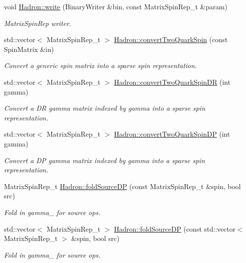\begin{DoxyCompactItemize}
void \mbox{\hyperlink{namespaceHadron_ae38baf2d1cfe9fdaf455f274e722b32f}{Hadron\+::write}} (Binary\+Writer \&bin, const Matrix\+Spin\+Rep\+\_\+t \&param)
\begin{DoxyCompactList}\small\item\em Matrix\+Spin\+Rep writer. \end{DoxyCompactList}\item 
std\+::vector$<$ Matrix\+Spin\+Rep\+\_\+t $>$ \mbox{\hyperlink{namespaceHadron_a6bcb90f42724a0f4ce09eeb64bd54c80}{Hadron\+::convert\+Two\+Quark\+Spin}} (const Spin\+Matrix \&in)
\begin{DoxyCompactList}\small\item\em Convert a generic spin matrix into a sparse spin representation. \end{DoxyCompactList}\item 
std\+::vector$<$ Matrix\+Spin\+Rep\+\_\+t $>$ \mbox{\hyperlink{namespaceHadron_aadefc7d519d40f16cb37c4df644944e7}{Hadron\+::convert\+Two\+Quark\+Spin\+DR}} (int gamma)
\begin{DoxyCompactList}\small\item\em Convert a DR gamma matrix indexed by gamma into a sparse spin representation. \end{DoxyCompactList}\item 
std\+::vector$<$ Matrix\+Spin\+Rep\+\_\+t $>$ \mbox{\hyperlink{namespaceHadron_a9d2555db4b8f920142f7c79e6752eccd}{Hadron\+::convert\+Two\+Quark\+Spin\+DP}} (int gamma)
\begin{DoxyCompactList}\small\item\em Convert a DP gamma matrix indexed by gamma into a sparse spin representation. \end{DoxyCompactList}\item 
Matrix\+Spin\+Rep\+\_\+t \mbox{\hyperlink{namespaceHadron_aa258f26ea52528eac314f32a02bf8ac3}{Hadron\+::fold\+Source\+DP}} (const Matrix\+Spin\+Rep\+\_\+t \&spin, bool src)
\begin{DoxyCompactList}\small\item\em Fold in gamma\+\_ for source ops. \end{DoxyCompactList}\item 
std\+::vector$<$ Matrix\+Spin\+Rep\+\_\+t $>$ \mbox{\hyperlink{namespaceHadron_a26162db6431302c5e52fbd5fafdbedae}{Hadron\+::fold\+Source\+DP}} (const std\+::vector$<$ Matrix\+Spin\+Rep\+\_\+t $>$ \&spin, bool src)
\begin{DoxyCompactList}\small\item\em Fold in gamma\+\_ for source ops. \end{DoxyCompactList}\item 

\end{DoxyCompactItemize}
